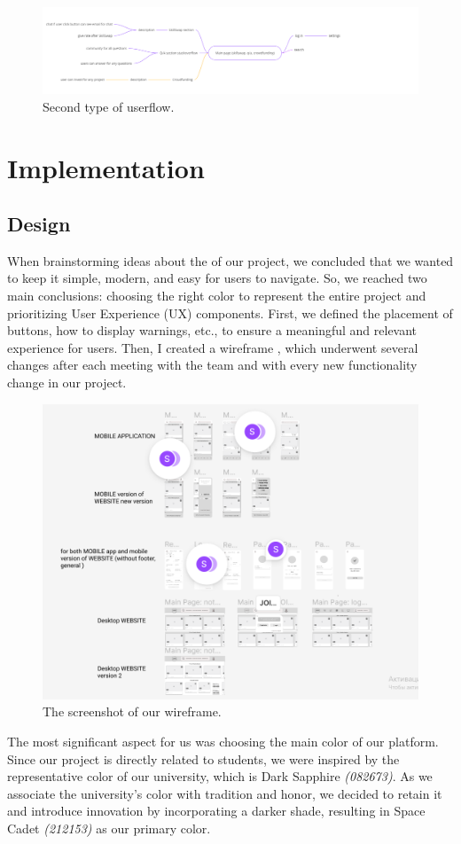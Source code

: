 \begin{figure}[ht]\label{fig:userflow2}
  \centering
  \includegraphics[width=0.8\linewidth]{figures/Userflow -2.png}
  \caption{Second type of userflow.}
\end{figure}

\newpage
\section{Implementation}\label{impl}
\subsection{Design}\label{des}
\hspace*{1cm} When brainstorming ideas about the  of our project, we concluded that we wanted to keep it simple, modern, and easy for users to navigate. So, we reached two main conclusions: choosing the right color to represent the entire project and prioritizing User Experience (UX) \cite{design} components. First, we defined the placement of buttons, how to display warnings, etc., to ensure a meaningful and relevant experience for users. Then, I created a wireframe \cite{wireframe}, which underwent several changes after each meeting with the team and with every new functionality change in our project.

\begin{figure}[ht]\label{fig:wireframe}
  \centering
  \includegraphics[width=0.8\linewidth]{figures/wireframe.png}
  \caption{The screenshot of our wireframe.}
\end{figure}
The most significant aspect for us was choosing the main color of our platform. Since our project is directly related to students, we were inspired by the representative color of our university, which is Dark Sapphire \textit{(082673)}. As we associate the university's color with tradition and honor, we decided to retain it and introduce innovation by incorporating a darker shade, resulting in Space Cadet \textit{(212153)} as our primary color. 

